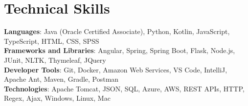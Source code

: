 \documentclass[letterpaper,11pt]{article}
\begin{document}
%
\section{Technical Skills}
 \begin{itemize}[leftmargin=0.15in, label={}]
    \small{\item{
     \textbf{Languages}{: Java (Oracle Certified Associate), Python, Kotlin, JavaScript, TypeScript, HTML, CSS, SPSS} \\
     \textbf{Frameworks and Libraries}{: Angular, Spring, Spring Boot, Flask, Node.js, JUnit, NLTK, Thymeleaf, JQuery} \\
     \textbf{Developer Tools}{: Git, Docker, Amazon Web Services, VS Code, IntelliJ, Apache Ant, Maven, Gradle, Postman} \\
     \textbf{Technologies}{: Apache Tomcat, JSON, SQL, Azure, AWS, REST APIs, HTTP, Regex, Ajax, Windows, Linux, Mac} \\
    }}
 \end{itemize}


\end{document}
